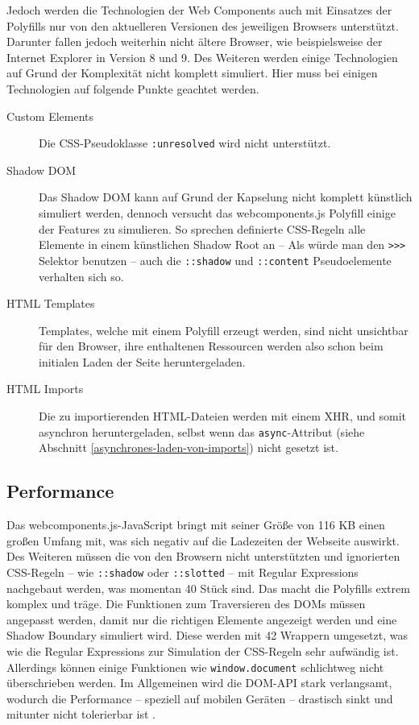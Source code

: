 Jedoch werden die Technologien der Web Components auch mit Einsatzes der Polyfills nur von den aktuelleren Versionen des jeweiligen Browsers unterstützt. Darunter fallen jedoch weiterhin nicht ältere Browser, wie beispielsweise der Internet Explorer in Version 8 und 9. Des Weiteren werden einige Technologien auf Grund der Komplexität nicht komplett simuliert. Hier muss bei einigen Technologien auf folgende Punkte geachtet werden.

\begin{description}
  \item[Custom Elements] Die \ac{CSS}-Pseudoklasse \texttt{:unresolved} wird nicht unterstützt.
  \item[Shadow \ac{DOM}] Das Shadow \ac{DOM} kann auf Grund der Kapselung nicht komplett künstlich simuliert werden, dennoch versucht das webcomponents.js Polyfill einige der Features zu simulieren. So sprechen definierte \ac{CSS}-Regeln alle Elemente in einem künstlichen Shadow Root an -- Als würde man den \texttt{\textgreater{}\textgreater{}\textgreater{}} Selektor benutzen -- auch die \texttt{::shadow} und \texttt{::content} Pseudoelemente verhalten sich so.
  \item[\ac{HTML} Templates] Templates, welche mit einem Polyfill erzeugt werden, sind nicht unsichtbar für den Browser, ihre enthaltenen Ressourcen werden also schon beim initialen Laden der Seite heruntergeladen.
  \item[\ac{HTML} Imports] Die zu importierenden \ac{HTML}-Dateien werden mit einem \ac{XHR}, und somit asynchron heruntergeladen, selbst wenn das \texttt{async}-Attribut (siehe Abschnitt \ref{asynchrones-laden-von-imports}) nicht gesetzt ist.
\end{description}


\subsection{Performance}\label{performance}

Das webcomponents.js-JavaScript \cite{citeulike:13914238} bringt mit seiner Größe von 116 KB einen großen Umfang mit, was sich negativ auf die Ladezeiten der Webseite auswirkt. Des Weiteren müssen die von den Browsern nicht unterstützten und ignorierten \ac{CSS}-Regeln -- wie \texttt{::shadow} oder \texttt{::slotted} -- mit Regular Expressions nachgebaut werden, was momentan 40 Stück sind. Das macht die Polyfills extrem komplex und träge. Die Funktionen zum Traversieren des \ac{DOM}s müssen angepasst werden, damit nur die richtigen Elemente angezeigt werden und eine Shadow Boundary simuliert wird. Diese werden mit 42 Wrappern umgesetzt, was wie die Regular Expressions zur Simulation der \ac{CSS}-Regeln sehr aufwändig ist. Allerdings können einige Funktionen wie \texttt{window.document} schlichtweg nicht überschrieben werden. Im Allgemeinen wird die \ac{DOM}-\ac{API} stark verlangsamt, wodurch die Performance -- speziell auf mobilen Geräten -- drastisch sinkt und mitunter nicht tolerierbar ist \cite{citeulike:13886251}.


